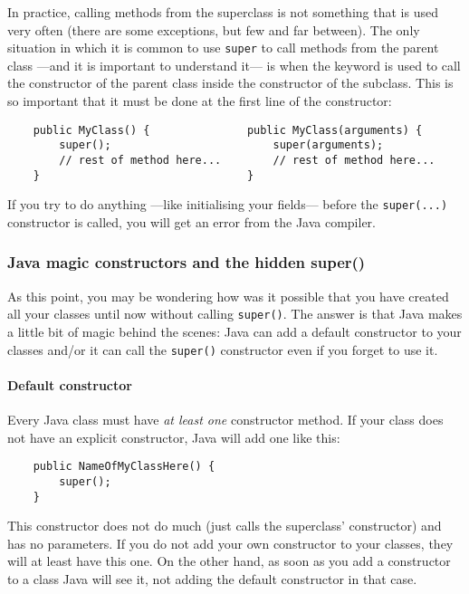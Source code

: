 In practice, calling methods from the superclass is not something that
is used very often (there are some exceptions, but few and far
between). 
The only situation in which it is common to use \verb+super+ to call
methods from the parent class ---and it is important to understand
it--- is when the keyword is used to call the constructor of the parent class
inside the constructor of the subclass. This is so important that it must be
done at the first line of the constructor: 

\begin{verbatim}
    public MyClass() {               public MyClass(arguments) {
        super();                         super(arguments);
        // rest of method here...        // rest of method here...    
    }                                }
\end{verbatim}

If you try to do anything ---like initialising your fields--- before
the \verb+super(...)+ constructor is called, you will get an error
from the Java compiler. 

\subsubsection*{Java magic constructors and the hidden super()}
\label{sec:hidden-super}

As this point, you may be wondering how was it possible that you have
created all your classes until now without calling \verb+super()+. The
answer is that Java makes a little bit of magic behind the scenes:
Java can add a default constructor to your classes and/or it can call
the \verb+super()+ constructor even if you forget to use it. 

\paragraph{Default constructor}
\label{sec:default-constructor}

Every Java class must have \emph{at least one} constructor method. If your
class does not have an explicit constructor, Java will add one like
this: 

\begin{verbatim}
    public NameOfMyClassHere() {
        super();
    }
\end{verbatim}

This constructor does not do much (just calls the superclass'
constructor) and has no parameters. If you do not add your own
constructor to your classes, they will at least have this one. On the
other hand, as soon as you add a constructor to a class Java will see
it, not adding the default constructor in that case.

